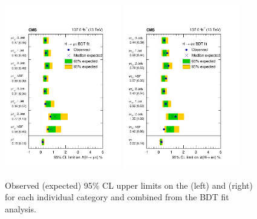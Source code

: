 \begin{figure}[htbp!]
  \centering
  \includegraphics[width=0.45\textwidth]{plots/chapter9/limits/BDTMu.pdf}
  \includegraphics[width=0.45\textwidth]{plots/chapter9/limits/BDTE.pdf} \\
  \caption{Observed (expected) 95\% CL upper limits on the \BHmt (left) and \BHet (right) for each individual category and combined from the BDT fit analysis.}
  \label{fig:bdt_limits}
\end{figure}


